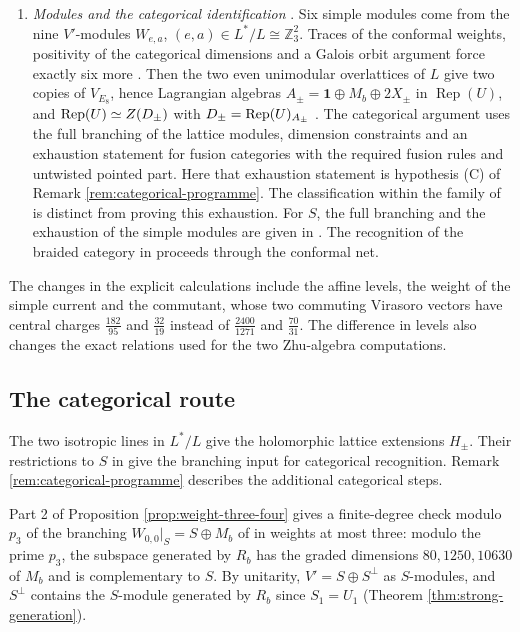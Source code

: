 \documentclass[leqno]{article}
\let\cal\relax
\newcommand{\cal}{\mathcal}
\newcommand{\Z}{\ensuremath{\mathbb{Z}}}
\DeclareMathOperator{\Rep}{Rep}
\numberwithin{equation}{section}
\begin{document}
\begin{enumerate}
\item \emph{Modules and the categorical identification} \cite[Parts IV--V, pp.~56--70]{Rie26b}. Six simple modules come from the nine $V'$-modules $W_{e,a}$, $(e,a) \in L^*/L \cong \Z_3^2$. Traces of the conformal weights, positivity of the categorical dimensions and a Galois orbit argument force exactly six more \cite[Section 11]{Rie26b}. Then the two even unimodular overlattices of $L$ give two copies of $V_{E_8}$, hence Lagrangian algebras $A_\pm = \mathbf 1 \oplus M_b \oplus 2X_\pm$ in $\Rep(U)$, and $\Rep(U) \simeq Z(\cal D_\pm)$ with $\cal D_\pm = \Rep(U)_{A_\pm}$ \cite[Lemma 12.2]{Rie26b} \cite{DMNO13}. The categorical argument uses the full branching of the lattice modules, dimension constraints and an exhaustion statement for fusion categories with the required fusion rules and untwisted pointed part. Here that exhaustion statement is hypothesis (C) of Remark \ref{rem:categorical-programme}. The classification within the family of \cite[Theorems 2 and 3]{EvG17} is distinct from proving this exhaustion. For $S$, the full branching and the exhaustion of the simple modules are given in \cite[Theorem 2.2(F2)--(F3)]{ArhIII}. The recognition of the braided category in \cite[Theorem 6.1]{ArhIII} proceeds through the conformal net.
\end{enumerate}

The changes in the explicit calculations include the affine levels, the weight of the simple current and the commutant, whose two commuting Virasoro vectors have central charges $\frac{182}{95}$ and $\frac{32}{19}$ instead of $\frac{2400}{1271}$ and $\frac{70}{31}$. The difference in levels also changes the exact relations used for the two Zhu-algebra computations.

\subsection{The categorical route}
\label{subsec:categorical-route}

The two isotropic lines in $L^*/L$ give the holomorphic lattice extensions $H_\pm$. Their restrictions to $S$ in \cite[Theorem 2.2(F3)]{ArhIII} give the branching input for categorical recognition. Remark \ref{rem:categorical-programme} describes the additional categorical steps.

Part 2 of Proposition \ref{prop:weight-three-four} gives a finite-degree check modulo $p_3$ of the branching $W_{0,0}|_S = S \oplus M_b$ of \cite[Theorem 2.2(F3)]{ArhIII} in weights at most three: modulo the prime $p_3$, the subspace generated by $R_b$ has the graded dimensions $80, 1250, 10630$ of $M_b$ and is complementary to $S$. By unitarity, $V' = S \oplus S^\perp$ as $S$-modules, and $S^\perp$ contains the $S$-module generated by $R_b$ since $S_1 = U_1$ (Theorem \ref{thm:strong-generation}).
\end{document}

